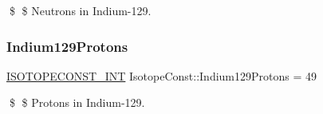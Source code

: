 \$ \$ Neutrons in Indium-\/129. \mbox{\label{group___isotope_const-_indium-_in129_gae0d5ba22e44ec1dd7aa3e7beb42878d5}} 
\subsubsection{\texorpdfstring{Indium129\+Protons}{Indium129Protons}}
{\footnotesize\ttfamily \mbox{\hyperlink{group___isotope_const-_macros_ga5f18360b3e99483a35c32d789e62621c}{I\+S\+O\+T\+O\+P\+E\+C\+O\+N\+S\+T\+\_\+\+I\+NT}} Isotope\+Const\+::\+Indium129\+Protons = 49}

\$ \$ Protons in Indium-\/129. 